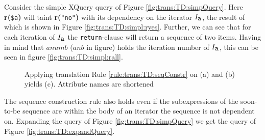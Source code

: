 \begin{myExample}
\label{ex:trans:TD:simpleSeq}

Consider the simple XQuery query of Figure \ref{fig:trans:TD:simpQuery}. Here \textbf{r(}\texttt{\$a}\textbf{)}
will taint \textbf{r(}\texttt{"no"}\textbf{)} with its dependency on the iterator $I_{\mbox{\texttt{a}}}$, the
result of which is shown in Figure \ref{fig:trans:TD:simpl:ryes}. Further, we can see that for each iteration of
$I_{\mbox{\texttt{a}}}$ the \texttt{return}-clause will return a sequence of two items. Having in mind that
$anumb$ ($anb$ in figure) holds the iteration number of $I_{\mbox{\texttt{a}}}$, this can be seen in figure
\ref{fig:trans:TD:simpl:rall}.

\begin{figure}[!h]
\centering
{}
\qquad
{}
\qquad
{}

\caption[Example: constructing a sequence]{Applying translation Rule \ref{rule:trans:TD:seqConstr} on (a) and (b)
yields (c). Attribute names are shortened \label{fig:trans:TD:simpleSeq}}
\end{figure}

The sequence construction rule also holds even if the subexpressions of the
soon-to-be sequence are within the body of an iterator the sequence is not
dependent on. Expanding the query of Figure \ref{fig:trans:TD:simpQuery} we get
the query of Figure \ref{fig:trans:TD:expandQuery}. 


\end{myExample}
